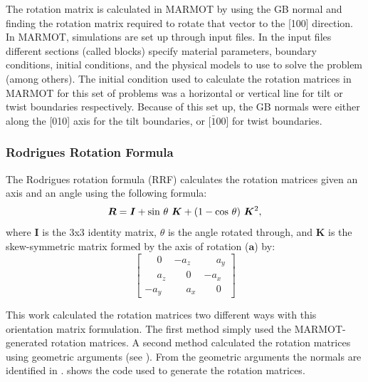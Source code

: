\documentclass[twoside,senior]{BYUPhys}
\begin{document}
The rotation matrix is calculated in MARMOT by using the GB normal and finding the rotation matrix required to rotate that vector to the [100] direction.  In MARMOT, simulations are set up through input files.  In the input files different sections (called blocks) specify material parameters, boundary conditions, initial conditions, and the physical models to use to solve the problem (among others).  The initial condition used to calculate the rotation matrices in MARMOT for this set of problems was a horizontal or vertical line for tilt or twist boundaries respectively.  Because of this set up, the GB normals were either along the [010] axis for the tilt boundaries, or [$\bar{1}$00] for twist boundaries.

\subsubsection{Rodrigues Rotation Formula\label{PQ:RRF}}
The Rodrigues rotation formula\cite{belongie2006} (RRF) calculates the rotation matrices given an axis and an angle using the following formula:
\begin{equation}
\label{eq:rrf}
\bm{R} = \bm{I} + \textnormal{sin}\ \theta\ \bm{K} + (1 - \textnormal{cos}\ \theta)\ \bm{K}^2,
\end{equation}
where $\bm{I}$ is the 3x3 identity matrix, $\theta$ is the angle rotated through, and $\bm{K}$ is the skew-symmetric matrix formed by the axis of rotation ($\bm{a}$) by:
\begin{equation}
\label{eq:skewSymMat}
\left[
\begin{array}{ccc}
\phantom{-}0 & -a_z & \phantom{-}a_y \\
\phantom{-}a_z & \phantom{-}0 & -a_x \\
-a_y & \phantom{-}a_x & \phantom{-}0
\end{array}
\right]
\end{equation}

This work calculated the rotation matrices two different ways with this orientation matrix formulation.  The first method simply used the MARMOT-generated rotation matrices.  A second method calculated the rotation matrices using geometric arguments (see ).  From the geometric arguments the normals are identified in .   shows the code used to generate the rotation matrices.
\end{document}
